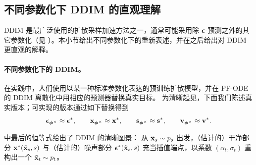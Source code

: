 \subsection{不同参数化下 DDIM 的直观理解}\label{subsec:ddim-different-para}

DDIM 是最广泛使用的扩散采样加速方法之一，通常可能采用除 ${\bm{\epsilon}}$-预测之外的其它参数化（见 ）。本小节给出不同参数化下的重新表述，并在之后给出对 DDIM 更直观的解释。


\paragraph{不同参数化下的 DDIM。}
在实践中，人们使用以某一种标准参数化表达的预训练扩散模型，并在 PF-ODE 的 DDIM 离散化中用相应的预测器替换真实目标。
为清晰起见，下面我们陈述真实版本；可实现的版本通过如下替换得到
\[
\bm{\epsilon}_{\bm{\phi}^\times} \approx \bm{\epsilon}^*, 
\qquad 
{\mathbf{x}}_{\bm{\phi}^\times} \approx {\mathbf{x}}^*, 
\qquad 
{\mathbf{s}}_{\bm{\phi}^\times} \approx {\mathbf{s}}^*, 
\qquad   
{\mathbf{v}}_{\bm{\phi}^\times} \approx {\mathbf{v}}^*.
\]



 中最后的恒等式给出了 DDIM 的清晰图景：
从 $\tilde{{\mathbf{x}}}_s\sim p_s$ 出发，（估计的）干净部分 ${\mathbf{x}}^*(\tilde{{\mathbf{x}}}_s,s)$ 与（估计的）噪声部分
${\bm{\epsilon}}^*(\tilde{{\mathbf{x}}}_s,s)$ 充当插值端点，以系数 $(\alpha_t,\sigma_t)$ 重构出一个 $\tilde{{\mathbf{x}}}_t \sim p_t$。


